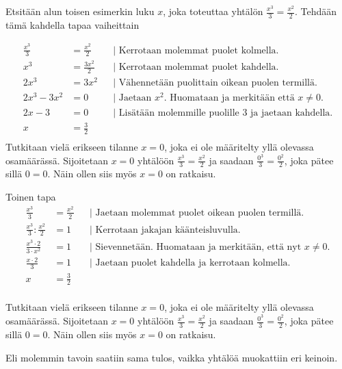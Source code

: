 \begin{esimerkki}
Etsitään alun toisen esimerkin luku $x$, joka toteuttaa yhtälön $\frac{x^3}{3}=\frac{x^2}{2}$. Tehdään tämä kahdella tapaa vaiheittain

		\begin{align*}
			\frac{x^3}{3}&=\frac{x^2}{2} && \text{| Kerrotaan molemmat puolet kolmella.} \\
			x^3 &=\frac{3x^2}{2}   && \text{| Kerrotaan molemmat puolet kahdella.} \\
			2x^3 &=3x^2 && \text{| Vähennetään puolittain oikean puolen termillä.} \\
			2x^3 -3x^2&=0 && \text{| Jaetaan $x^2$. Huomataan ja merkitään että $x\neq0$.} \\
			2x -3&=0 && \text{| Lisätään molemmille puolille $3$ ja jaetaan kahdella.} \\ 
			x&=\frac{3}{2} && \\
		\end{align*}
Tutkitaan vielä erikseen tilanne $x=0$, joka ei ole määritelty yllä olevassa osamäärässä. Sijoitetaan $x=0$ yhtälöön $\frac{x^3}{3}=\frac{x^2}{2}$ ja saadaan $\frac{0^3}{3}=\frac{0^2}{2}$, joka pätee sillä $0=0$. Näin ollen siis myös $x=0$ on ratkaisu. 



Toinen tapa
\begin{align*}
\frac{x^3}{3}&=\frac{x^2}{2} && \text{| Jaetaan molemmat puolet oikean puolen termillä. } \\
\frac{x^3}{3}:\frac{x^2}{2}&=1 && \text{| Kerrotaan jakajan käänteisluvulla.} \\
\frac{x^3\cdot2}{3\cdot x^2}&=1 && \text{| Sievennetään. Huomataan ja merkitään, että nyt $x\neq0$.} \\
\frac{x\cdot2}{3}&=1 && \text{| Jaetaan puolet kahdella ja kerrotaan kolmella.} \\
x&=\frac{3}{2} && \\
\end{align*}

Tutkitaan vielä erikseen tilanne $x=0$, joka ei ole määritelty yllä olevassa osamäärässä. Sijoitetaan $x=0$ yhtälöön $\frac{x^3}{3}=\frac{x^2}{2}$ ja saadaan $\frac{0^3}{3}=\frac{0^2}{2}$, joka pätee sillä $0=0$. Näin ollen siis myös $x=0$ on ratkaisu.

Eli molemmin tavoin saatiin sama tulos, vaikka yhtälöä muokattiin eri keinoin.



\end{esimerkki}

